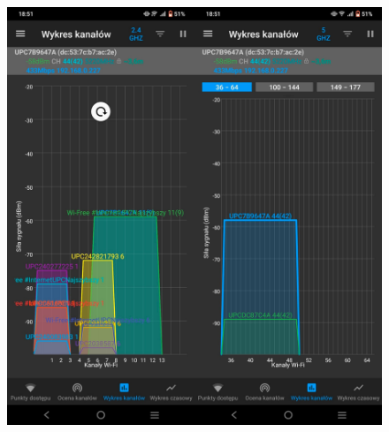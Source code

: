 \documentclass[a4paper,11pt]{article}
\begin{document}
\begin{figure}[h!]
\includegraphics[scale=0.23]{image.jpg}
\end{figure}
\end{document}
